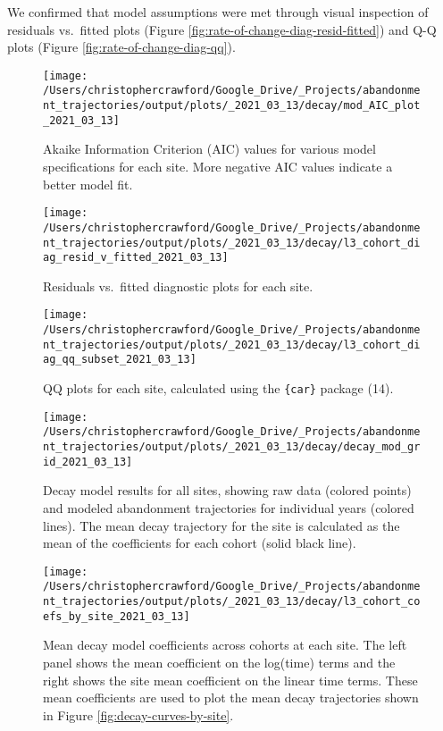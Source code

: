 \documentclass[9pt,twoside,lineno]{pnas-new}
\begin{document}
We confirmed that model assumptions were met through visual inspection of residuals vs.~fitted plots (Figure \ref{fig:rate-of-change-diag-resid-fitted}) and Q-Q plots (Figure \ref{fig:rate-of-change-diag-qq}).



\begin{figure}
\texttt{[image: /Users/christophercrawford/Google\_Drive/\_Projects/abandonment\_trajectories/output/plots/\_2021\_03\_13/decay/mod\_AIC\_plot\_2021\_03\_13]} \caption{Akaike Information Criterion (AIC) values for various model specifications for each site. More negative AIC values indicate a better model fit.}\label{fig:AIC}
\end{figure}



\begin{figure}
\texttt{[image: /Users/christophercrawford/Google\_Drive/\_Projects/abandonment\_trajectories/output/plots/\_2021\_03\_13/decay/l3\_cohort\_diag\_resid\_v\_fitted\_2021\_03\_13]} \caption{Residuals vs.~fitted diagnostic plots for each site.}\label{fig:diag-resid-fitted}
\end{figure}



\begin{figure}
\texttt{[image: /Users/christophercrawford/Google\_Drive/\_Projects/abandonment\_trajectories/output/plots/\_2021\_03\_13/decay/l3\_cohort\_diag\_qq\_subset\_2021\_03\_13]} \caption{QQ plots for each site, calculated using the \texttt{\{car\}} package (14).}\label{fig:diag-qq}
\end{figure}



\begin{figure}
\texttt{[image: /Users/christophercrawford/Google\_Drive/\_Projects/abandonment\_trajectories/output/plots/\_2021\_03\_13/decay/decay\_mod\_grid\_2021\_03\_13]} \caption{Decay model results for all sites, showing raw data (colored points) and modeled abandonment trajectories for individual years (colored lines). The mean decay trajectory for the site is calculated as the mean of the coefficients for each cohort (solid black line).}\label{fig:decay-model-grid}
\end{figure}



\begin{figure}
\texttt{[image: /Users/christophercrawford/Google\_Drive/\_Projects/abandonment\_trajectories/output/plots/\_2021\_03\_13/decay/l3\_cohort\_coefs\_by\_site\_2021\_03\_13]} \caption{Mean decay model coefficients across cohorts at each site. The left panel shows the mean coefficient on the log(time) terms and the right shows the site mean coefficient on the linear time terms. These mean coefficients are used to plot the mean decay trajectories shown in Figure \ref{fig:decay-curves-by-site}.}\label{fig:decay-mod-coef}
\end{figure}
\end{document}
